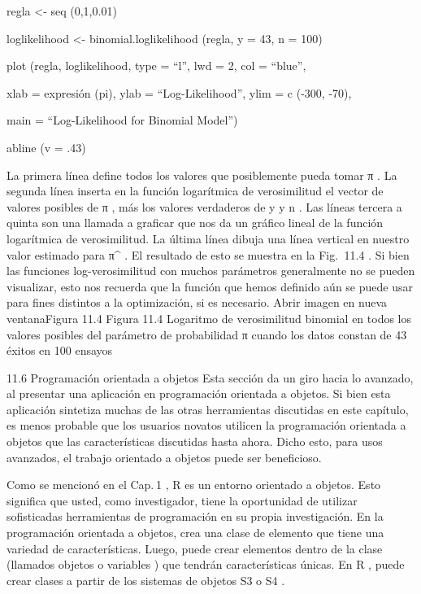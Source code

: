 \documentclass[
]{book}
\begin{document}
regla \textless- seq (0,1,0.01)

loglikelihood \textless- binomial.loglikelihood (regla, y = 43, n = 100)

plot (regla, loglikelihood, type = ``l'', lwd = 2, col = ``blue'',

xlab = expresión (pi), ylab = ``Log-Likelihood'', ylim = c (-300, -70),

main = ``Log-Likelihood for Binomial Model'')

abline (v = .43)

La primera línea define todos los valores que posiblemente pueda tomar π . La segunda línea inserta en la función logarítmica de verosimilitud el vector de valores posibles de π , más los valores verdaderos de y y n . Las líneas tercera a quinta son una llamada a graficar que nos da un gráfico lineal de la función logarítmica de verosimilitud. La última línea dibuja una línea vertical en nuestro valor estimado para π\^{} . El resultado de esto se muestra en la Fig.  11.4 . Si bien las funciones log-verosimilitud con muchos parámetros generalmente no se pueden visualizar, esto nos recuerda que la función que hemos definido aún se puede usar para fines distintos a la optimización, si es necesario.
Abrir imagen en nueva ventanaFigura 11.4
Figura 11.4
Logaritmo de verosimilitud binomial en todos los valores posibles del parámetro de probabilidad π cuando los datos constan de 43 éxitos en 100 ensayos

11.6 Programación orientada a objetos
Esta sección da un giro hacia lo avanzado, al presentar una aplicación en programación orientada a objetos. Si bien esta aplicación sintetiza muchas de las otras herramientas discutidas en este capítulo, es menos probable que los usuarios novatos utilicen la programación orientada a objetos que las características discutidas hasta ahora. Dicho esto, para usos avanzados, el trabajo orientado a objetos puede ser beneficioso.

Como se mencionó en el Cap. 1 , R es un entorno orientado a objetos. Esto significa que usted, como investigador, tiene la oportunidad de utilizar sofisticadas herramientas de programación en su propia investigación. En la programación orientada a objetos, crea una clase de elemento que tiene una variedad de características. Luego, puede crear elementos dentro de la clase (llamados objetos o variables ) que tendrán características únicas. En R , puede crear clases a partir de los sistemas de objetos S3 o S4 .
\end{document}
